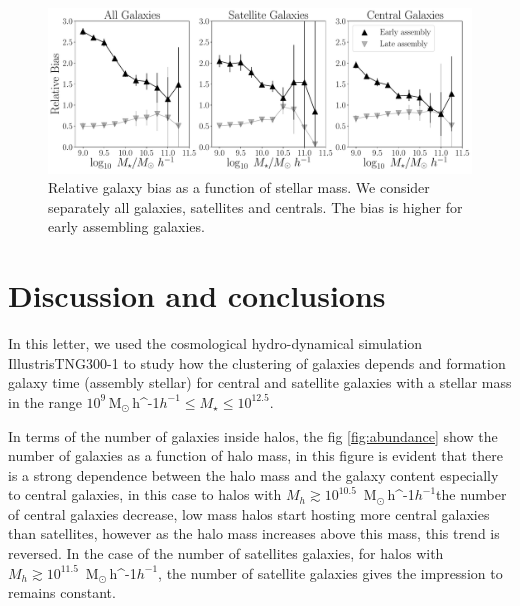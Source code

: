 \documentclass[a4paper,fleqn,usenatbib]{mnras}
\newcommand{\Msunh}{\,{\rm M}$_{\odot}$\,\ifmmode h^{-1}\else $h^{-1}$\fi}
\begin{document}
\begin{figure}
    \centering
    \includegraphics[width=2.0\columnwidth]{figuras/bias_galaxies.pdf}
    \caption{Relative galaxy bias as a function of stellar mass.
    We consider separately all galaxies, satellites and centrals.
    The bias is higher for early assembling galaxies.}
    \label{fig:galaxy_bias}
\end{figure}

\section{Discussion and conclusions}
\label{sec:conclu}
In this letter, we used the cosmological hydro-dynamical simulation IllustrisTNG300-1 to study how the clustering of galaxies depends and formation galaxy time (assembly stellar) for central and satellite galaxies with a stellar mass in the range $10^{9}$\Msunh $\leq M_{\star} \leq 10^{12.5}$.


In terms of the number of galaxies inside halos, the fig \ref{fig:abundance} show the number of galaxies as a function of halo mass, in this figure is evident that there is a strong dependence between the halo mass and the galaxy content especially to central galaxies, in this case to halos with $M_h \gtrsim 10^{10.5}$ \Msunh the number of central galaxies decrease, low mass halos start hosting more central galaxies than satellites, however as the halo mass increases above this mass, this trend is reversed. In the case of the number of satellites galaxies, for halos with $M_h\gtrsim 10^{11.5}$ \Msunh, the number of satellite galaxies gives the impression to remains constant. %
\end{document}
